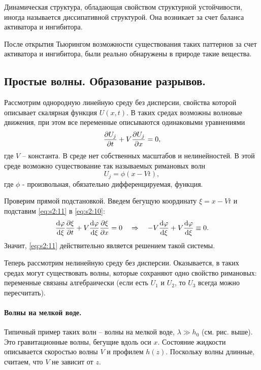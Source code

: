 Динамическая структура, обладающая свойством структурной устойчивости, иногда называется диссипативной структурой. Она возникает за счет баланса активатора и ингибитора. 

После открытия Тьюрингом возможности существования таких паттернов за счет активатора и ингибитора, были реально обнаружены в природе такие вещества.



\subsection{Простые волны. Образование разрывов.}
Рассмотрим однородную линейную среду без дисперсии, свойства которой описывает скалярная функция $U(x,t)$. В таких средах возможны волновые движения, при этом все переменные описываются одинаковыми уравнениями
\begin{equation}
	\pdv{U_j}{t}+V\pdv{U_j}{x}=0,
	\label{eq:s2:10}
\end{equation}
где $V$ -- константа. В среде нет собственных масштабов и нелинейностей. В этой среде возможно существование так называемых римановых волн
\begin{equation}
	U_j=\phi(x-Vt),
	\label{eq:s2:11}
\end{equation}
где $\phi$ - произвольная, обязательно дифференцируемая, функция.

Проверим прямой подстановкой. Введем бегущую координату $\xi=x-Vt$ и подставим \eqref{eq:s2:11} в \eqref{eq:s2:10}:
\begin{gather*}
	\dv{\varphi}{\xi} \pdv{\xi}{t}+V\dv{\varphi}{\xi} \pdv{\xi}{x}=0
	\quad\Rightarrow\quad
	-V\dv{\varphi}{\xi}+V \dv{\varphi}{\xi} \equiv 0.
\end{gather*}
Значит, \eqref{eq:s2:11} действительно является решением такой системы. 

Теперь рассмотрим нелинейную среду без дисперсии. Оказывается, в таких средах могут существовать волны, которые сохраняют одно свойство римановых:  переменные связаны алгебраически (если есть $U_1$ и $U_2$, то $U_3$ всегда можно пересчитать). 



\newpage
\paragraph{Волны на мелкой воде. } Типичный пример таких волн -- волны на мелкой воде, $\lambda \gg h_0$ (см. рис. выше). Это гравитационные волны, бегущие вдоль оси $x$. 
Состояние жидкости описывается скоростью волны $V$  и профилем $h(z)$. Поскольку волны длинные, считаем, что $V$ не зависит от $z$.

